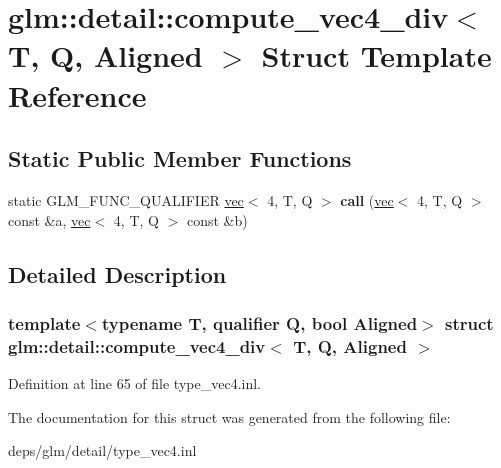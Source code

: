 \hypertarget{structglm_1_1detail_1_1compute__vec4__div}{}\section{glm\+:\+:detail\+:\+:compute\+\_\+vec4\+\_\+div$<$ T, Q, Aligned $>$ Struct Template Reference}
\label{structglm_1_1detail_1_1compute__vec4__div}
\subsection*{Static Public Member Functions}
\begin{DoxyCompactItemize}
\item 
\mbox{\label{structglm_1_1detail_1_1compute__vec4__div_aa509cf7a53575bad020952593cf592d3}} 
static G\+L\+M\+\_\+\+F\+U\+N\+C\+\_\+\+Q\+U\+A\+L\+I\+F\+I\+ER \hyperlink{structglm_1_1vec}{vec}$<$ 4, T, Q $>$ {\bfseries call} (\hyperlink{structglm_1_1vec}{vec}$<$ 4, T, Q $>$ const \&a, \hyperlink{structglm_1_1vec}{vec}$<$ 4, T, Q $>$ const \&b)
\end{DoxyCompactItemize}


\subsection{Detailed Description}
\subsubsection*{template$<$typename T, qualifier Q, bool Aligned$>$\newline
struct glm\+::detail\+::compute\+\_\+vec4\+\_\+div$<$ T, Q, Aligned $>$}



Definition at line 65 of file type\+\_\+vec4.\+inl.



The documentation for this struct was generated from the following file\+:\begin{DoxyCompactItemize}
\item 
deps/glm/detail/type\+\_\+vec4.\+inl\end{DoxyCompactItemize}
